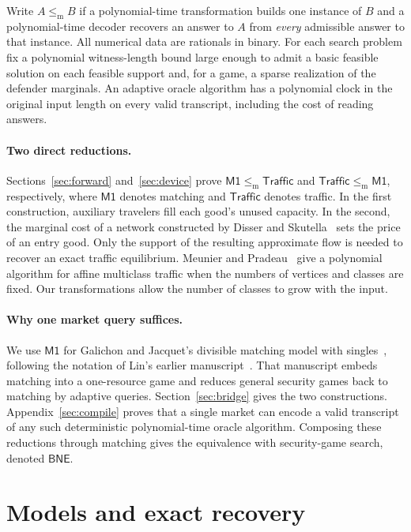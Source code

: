 \documentclass[11pt]{article}
\newcommand{\Market}{\mathsf{M1}}
\newcommand{\Traffic}{\mathsf{Traffic}}
\newcommand{\BNE}{\mathsf{BNE}}
\newcommand{\dd}{\mathrel{\leq_{\mathrm m}}}
\begin{document}
Write \(A\dd B\) if a polynomial-time transformation builds one instance
of \(B\) and a polynomial-time decoder recovers an answer to \(A\) from
\emph{every} admissible answer to that instance. All numerical data are
rationals in binary. For each search problem fix a polynomial witness-length
bound large enough to admit a basic feasible solution on each feasible
support and, for a game, a sparse realization of the defender marginals.
An adaptive oracle algorithm has a polynomial clock in the original input
length on every valid transcript, including the cost of reading answers.

\paragraph{Two direct reductions.}
Sections~\ref{sec:forward} and~\ref{sec:device} prove
\(\Market\dd\Traffic\) and \(\Traffic\dd\Market\), respectively, where
\(\Market\) denotes matching and \(\Traffic\) denotes traffic. In the
first construction, auxiliary travelers fill each good's unused capacity.
In the second, the marginal cost of a network constructed by Disser and
Skutella~\cite[Section~3.1]{ds} sets the price of an entry good. Only the
support of the resulting approximate flow is needed to recover an exact
traffic equilibrium. Meunier and Pradeau~\cite[Theorem~1]{mp} give a
polynomial algorithm for affine multiclass traffic when the numbers of
vertices and classes are fixed. Our transformations allow the number of
classes to grow with the input.

\paragraph{Why one market query suffices.}
We use \(\Market\) for Galichon and Jacquet's divisible matching model with
singles~\cite{gj}, following the notation of Lin's earlier manuscript~\cite{book}.
That manuscript embeds matching into a one-resource game and reduces general
security games back to matching by adaptive queries. Section~\ref{sec:bridge}
gives the two constructions. Appendix~\ref{sec:compile} proves that a
single market can encode a valid transcript of any such deterministic
polynomial-time oracle algorithm. Composing these reductions through
matching gives the equivalence with security-game search, denoted \(\BNE\).

\section{Models and exact recovery}\label{sec:models}
\end{document}
